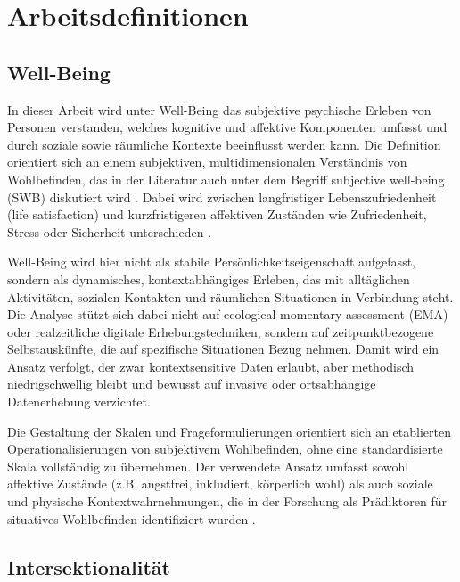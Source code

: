 \section{Arbeitsdefinitionen}

\subsection{Well-Being}

In dieser Arbeit wird unter Well-Being das subjektive psychische Erleben von Personen verstanden, welches kognitive und affektive Komponenten umfasst und durch soziale sowie räumliche Kontexte beeinflusst werden kann. Die Definition orientiert sich an einem subjektiven, multidimensionalen Verständnis von Wohlbefinden, das in der Literatur auch unter dem Begriff \glqq subjective well-being\grqq{} (SWB) diskutiert wird \parencite{dienerSubjectiveWellBeingGeneral2009, kahnemanDevelopmentsMeasurementSubjective2006}. Dabei wird zwischen langfristiger Lebenszufriedenheit (life satisfaction) und kurzfristigeren affektiven Zuständen wie Zufriedenheit, Stress oder Sicherheit unterschieden \parencite{schwanenWellBeingContextEveryday2014}.

Well-Being wird hier nicht als stabile Persönlichkeitseigenschaft aufgefasst, sondern als dynamisches, kontextabhängiges Erleben, das mit alltäglichen Aktivitäten, sozialen Kontakten und räumlichen Situationen in Verbindung steht. Die Analyse stützt sich dabei nicht auf ecological momentary assessment (EMA) oder realzeitliche digitale Erhebungstechniken, sondern auf zeitpunktbezogene Selbstauskünfte, die auf spezifische Situationen Bezug nehmen. Damit wird ein Ansatz verfolgt, der zwar kontextsensitive Daten erlaubt, aber methodisch niedrigschwellig bleibt und bewusst auf invasive oder ortsabhängige Datenerhebung verzichtet.

Die Gestaltung der Skalen und Frageformulierungen orientiert sich an etablierten Operationalisierungen von subjektivem Wohlbefinden, ohne eine standardisierte Skala vollständig zu übernehmen. Der verwendete Ansatz umfasst sowohl affektive Zustände (z.B. \glqq angstfrei\grqq, \glqq inkludiert\grqq, \glqq körperlich wohl\grqq) als auch soziale und physische Kontextwahrnehmungen, die in der Forschung als Prädiktoren für situatives Wohlbefinden identifiziert wurden \parencite{bautistaWhatWellbeingScoping2023, schwanenWellBeingContextEveryday2014}.

\subsection{Intersektionalität}

